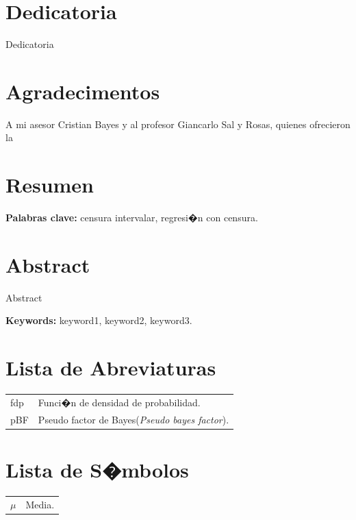 \documentclass[11pt,oneside,a4paper]{book}
\begin{document}
\chapter*{Dedicatoria}
Dedicatoria



\chapter*{Agradecimentos}
A mi asesor Cristian Bayes y al profesor Giancarlo Sal y Rosas, quienes ofrecieron la 

\chapter*{Resumen}

\noindent \textbf{Palabras clave:} censura intervalar, regresi�n con censura.

\chapter*{Abstract}
Abstract

\noindent \textbf{Keywords:} keyword1, keyword2, keyword3.

\tableofcontents    %


\chapter{Lista de Abreviaturas}
\begin{tabular}{ll}
 		fdp     & Funci�n de densidad de probabilidad.\\
	pBF 		& Pseudo factor de Bayes(\emph{Pseudo bayes factor}).\\
\end{tabular}

\chapter{Lista de S�mbolos}
\begin{tabular}{ll}
		$\mu$    & Media.\\
\end{tabular}
\end{document}
